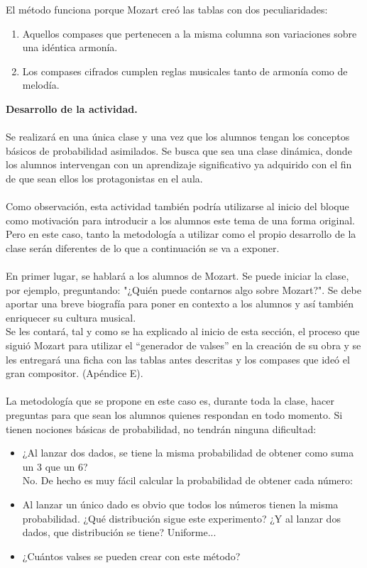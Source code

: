 \documentclass[a4paper, openright, 11pt, titlepage]{report}
\theoremstyle{definition}\newtheorem{defin}[propo]{Definition}
\theoremstyle{definition}\newtheorem{obser}[propo]{Remark}
\theoremstyle{definition}\newtheorem{ejem}[propo]{Ejemplo}
\theoremstyle{definition}\newtheorem{algoritmo}[propo]{Algoritmo}
\begin{document}
El método funciona porque Mozart creó las tablas con dos peculiaridades:
\begin{enumerate}
    \item Aquellos compases que pertenecen a la misma columna son variaciones sobre una idéntica armonía.
    \item Los compases cifrados cumplen reglas musicales tanto de armonía como de melodía.
\end{enumerate}
\textbf{Desarrollo de la actividad.}\\\\
Se realizará en una única clase y una vez que los alumnos tengan los conceptos básicos de probabilidad asimilados. Se busca que sea una clase dinámica, donde los alumnos intervengan con un aprendizaje significativo ya adquirido con el fin de que sean ellos los protagonistas en el aula.\\\\
Como observación, esta actividad también podría utilizarse al inicio del bloque como motivación para introducir a los alumnos este tema de una forma original. Pero en este caso, tanto la metodología a utilizar como el propio desarrollo de la clase serán diferentes de lo que a continuación se va a exponer.\\\\
En primer lugar, se hablará a los alumnos de Mozart. Se puede iniciar la clase, por ejemplo, preguntando: "¿Quién puede contarnos algo sobre Mozart?". Se debe aportar una breve biografía para poner en contexto a los alumnos y así también enriquecer su cultura musical.\\
Se les contará, tal y como se ha explicado al inicio de esta sección, el proceso que siguió Mozart para utilizar el “generador de valses” en la creación de su obra y se les entregará una ficha con las tablas antes descritas y los compases que ideó el gran compositor. (Apéndice E).\\\\
La metodología que se propone en este caso es, durante toda la clase, hacer preguntas para que sean los alumnos quienes respondan en todo momento. Si tienen nociones básicas de probabilidad, no tendrán ninguna dificultad:
\begin{itemize}
    \item ¿Al lanzar dos dados, se tiene la misma probabilidad de obtener como suma un 3 que un 6?\\
    No. De hecho es muy fácil calcular la probabilidad de obtener cada número:
    \item Al lanzar un único dado es obvio que todos los números tienen la misma probabilidad. ¿Qué distribución sigue este experimento? ¿Y al lanzar dos dados, que distribución se tiene?
    Uniforme...
    \item ¿Cuántos valses se pueden crear con este método?
    
\end{itemize}
\end{document}
